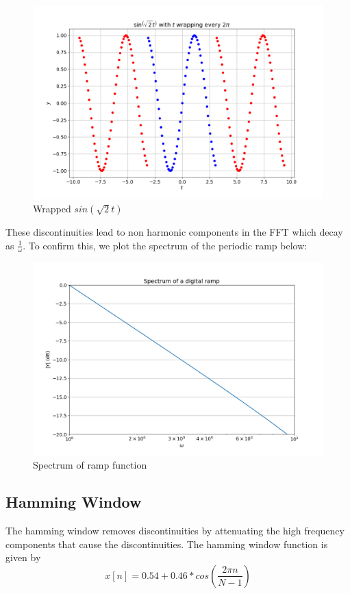 \documentclass[11pt, a4paper]{article}
\begin{document}
\begin{figure}[!tbh]
\centering
\includegraphics[scale=0.4]{plots/wrapped_sin.png}
\caption{Wrapped $sin(\sqrt{2}t)$}
\label{fig:3}
\end{figure}

These discontinuities lead to  non harmonic components in the FFT which decay as \(\frac{1}{\omega}\). To confirm
this, we plot the spectrum of the periodic ramp below:
\begin{figure}[!tbh]
\centering
\includegraphics[scale=0.4]{plots/ramp.png}
\caption{Spectrum of ramp function}
\label{fig:4}
\end{figure}

\subsection{Hamming Window}
The hamming window removes discontinuities by attenuating the high frequency components that cause the discontinuities.
The hamming window function is given by
\begin{equation}
    x[n] = 0.54 + 0.46*cos(\frac{2\pi n}{N-1})
\end{equation}
\end{document}
